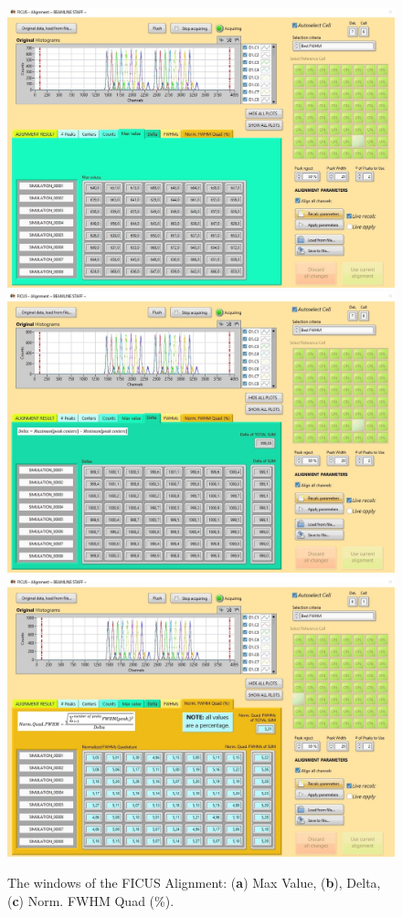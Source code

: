 \documentclass[a4paper,12pt,oneside,pdflatex,italian,final,twocolumn]{article}
\begin{document}
\begin{figure}[h]
\centering
\subfloat
{\includegraphics[width=.6\textwidth]{Cattura86.jpg}} \\
\subfloat
{\includegraphics[width=.6\textwidth]{Cattura87.jpg}} \\
\subfloat
{\includegraphics[width=.6\textwidth]{Cattura89.jpg}} \\
\caption{The windows of the FICUS Alignment: (\textbf{a}) Max Value, (\textbf{b}), Delta, (\textbf{c}) Norm. FWHM Quad (\%).}\label{fig:fig49}
\end{figure}
\end{document}
